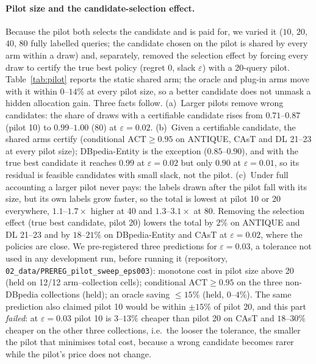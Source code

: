 \documentclass{article}
\newcommand{\eps}{\varepsilon}
\newcommand{\ACT}{\mathrm{ACT}}
\begin{document}
\paragraph{Pilot size and the candidate-selection effect.} Because the pilot both selects the candidate and is paid for, we varied it ($10$, $20$, $40$, $80$ fully labelled queries; the candidate chosen on the pilot is shared by every arm within a draw) and, separately, removed the selection effect by forcing every draw to certify the true best policy (regret $0$, slack $\eps$) with a 20-query pilot. Table~\ref{tab:pilot} reports the static shared arm; the oracle and plug-in arms move with it within $0$--$14\%$ at every pilot size, so a better candidate does not unmask a hidden allocation gain. Three facts follow. (a)~Larger pilots remove wrong candidates: the share of draws with a certifiable candidate rises from $0.71$--$0.87$ (pilot 10) to $0.99$--$1.00$ (80) at $\eps=0.02$. (b)~Given a certifiable candidate, the shared arms certify (conditional $\ACT\ge0.95$ on ANTIQUE, CAsT and DL 21--23 at every pilot size); DBpedia-Entity is the exception ($0.85$--$0.90$), and with the true best candidate it reaches $0.99$ at $\eps=0.02$ but only $0.90$ at $\eps=0.01$, so its residual is feasible candidates with small slack, not the pilot. (c)~Under full accounting a larger pilot never pays: the labels drawn after the pilot fall with its size, but its own labels grow faster, so the total is lowest at pilot 10 or 20 everywhere, $1.1$--$1.7\times$ higher at 40 and $1.3$--$3.1\times$ at 80. Removing the selection effect (true best candidate, pilot 20) lowers the total by $2\%$ on ANTIQUE and DL 21--23 and by $18$--$21\%$ on DBpedia-Entity and CAsT at $\eps=0.02$, where the policies are close. We pre-registered three predictions for $\eps=0.03$, a tolerance not used in any development run, before running it (repository, \texttt{02\_data/PREREG\_pilot\_sweep\_eps003}): monotone cost in pilot size above 20 (held on 12/12 arm--collection cells); conditional $\ACT\ge0.95$ on the three non-DBpedia collections (held); an oracle saving $\le15\%$ (held, $0$--$4\%$). The same prediction also claimed pilot 10 would be within $\pm15\%$ of pilot 20, and this part \emph{failed}: at $\eps=0.03$ pilot 10 is $3$--$13\%$ cheaper than pilot 20 on CAsT and $18$--$30\%$ cheaper on the other three collections, i.e.\ the looser the tolerance, the smaller the pilot that minimises total cost, because a wrong candidate becomes rarer while the pilot's price does not change.
\end{document}
